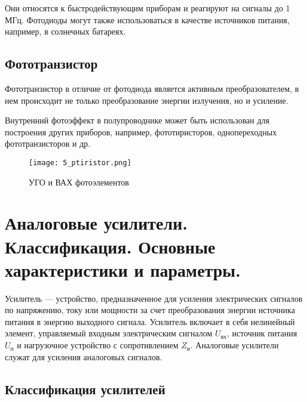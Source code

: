 Они относятся к быстродействующим приборам и реагируют на сигналы до 1 МГц. Фотодиоды могут также использоваться в качестве источников питания, например, в солнечных батареях.

\subsection*{Фототранзистор}

Фототранзистор в отличие от фотодиода является активным преобразователем, в нем происходит не только преобразование энергии излучения, но и усиление.

Внутренний фотоэффект в полупроводнике может быть использован для построения других приборов, например, фототиристоров, однопереходных фототранзисторов и др.

\begin{figure}[H]
\centering
\texttt{[image: 5\_ptiristor.png]}
\caption{УГО и ВАХ фотоэлементов}
\label{fig:5_ptiristor}
\end{figure}


\section{Аналоговые усилители. Классификация. Основные характеристики и параметры.}

Усилитель --- устройство, предназначенное для усиления электрических сигналов по напряжению, току или мощности за счет преобразования энергии источника питания в энергию выходного сигнала. Усилитель включает в себя нелинейный элемент, управляемый входным электрическим сигналом $U_\text{вх}$, источник питания $U_\text{п}$ и нагрузочное устройство с сопротивлением $Z_\text{н}$. Аналоговые усилители служат для усиления аналоговых сигналов.

\subsection*{Классификация усилителей}

